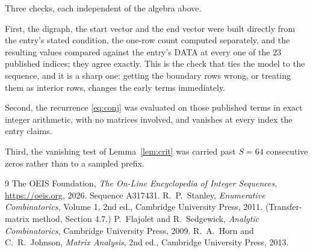 \documentclass[11pt,a4paper]{article}
\theoremstyle{plain}
\theoremstyle{definition}
\begin{document}
Three checks, each independent of the algebra above.

First, the digraph, the start vector and the end vector were built directly from the
entry's stated condition, the one-row count computed separately, and the resulting values
compared against the entry's DATA at every one of the $23$ published indices; they
agree exactly. This is the check that ties the model to the sequence, and it is a sharp one:
getting the boundary rows wrong, or treating them as interior rows, changes the early terms
immediately.

Second, the recurrence \eqref{eq:conj} was evaluated on those published terms in exact
integer arithmetic, with no matrices involved, and vanishes at every index the entry claims.

Third, the vanishing test of Lemma~\ref{lem:crit} was carried past $S=64$ consecutive
zeros rather than to a sampled prefix.

\begin{thebibliography}{9}
 The OEIS Foundation, \emph{The On-Line Encyclopedia of Integer
Sequences}, \url{https://oeis.org}, 2026. Sequence A317431.
 R.~P.~Stanley, \emph{Enumerative Combinatorics}, Volume 1, 2nd ed.,
Cambridge University Press, 2011. (Transfer-matrix method, Section 4.7.)
 P.~Flajolet and R.~Sedgewick, \emph{Analytic Combinatorics}, Cambridge
University Press, 2009.
 R.~A.~Horn and C.~R.~Johnson, \emph{Matrix Analysis}, 2nd ed., Cambridge
University Press, 2013.
\end{thebibliography}
\end{document}
